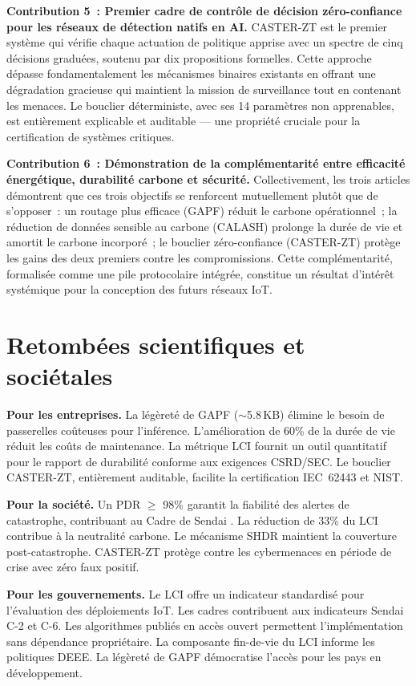 \textbf{Contribution 5~: Premier cadre de contrôle de décision zéro-confiance pour les réseaux de détection natifs en AI.}
CASTER-ZT est le premier système qui vérifie chaque actuation de politique apprise avec un spectre de cinq décisions graduées, soutenu par dix propositions formelles. Cette approche dépasse fondamentalement les mécanismes binaires existants en offrant une dégradation gracieuse qui maintient la mission de surveillance tout en contenant les menaces. Le bouclier déterministe, avec ses 14 paramètres non apprenables, est entièrement explicable et auditable --- une propriété cruciale pour la certification de systèmes critiques.

\textbf{Contribution 6~: Démonstration de la complémentarité entre efficacité énergétique, durabilité carbone et sécurité.}
Collectivement, les trois articles démontrent que ces trois objectifs se renforcent mutuellement plutôt que de s'opposer~: un routage plus efficace (GAPF) réduit le carbone opérationnel~; la réduction de données sensible au carbone (CALASH) prolonge la durée de vie et amortit le carbone incorporé~; le bouclier zéro-confiance (CASTER-ZT) protège les gains des deux premiers contre les compromissions. Cette complémentarité, formalisée comme une pile protocolaire intégrée, constitue un résultat d'intérêt systémique pour la conception des futurs réseaux IoT.


\section{Retombées scientifiques et sociétales}\label{sec:concl-retombees}

\textbf{Pour les entreprises.}
La légèreté de GAPF ($\sim$5.8\,KB) élimine le besoin de passerelles coûteuses pour l'inférence. L'amélioration de 60\% de la durée de vie réduit les coûts de maintenance. La métrique LCI fournit un outil quantitatif pour le rapport de durabilité conforme aux exigences CSRD/SEC. Le bouclier CASTER-ZT, entièrement auditable, facilite la certification IEC~62443 et NIST.

\textbf{Pour la société.}
Un PDR $\geq$ 98\% garantit la fiabilité des alertes de catastrophe, contribuant au Cadre de Sendai \cite{UNDRR2015Sendai}. La réduction de 33\% du LCI contribue à la neutralité carbone. Le mécanisme SHDR maintient la couverture post-catastrophe. CASTER-ZT protège contre les cybermenaces en période de crise avec zéro faux positif.

\textbf{Pour les gouvernements.}
Le LCI offre un indicateur standardisé pour l'évaluation des déploiements IoT. Les cadres contribuent aux indicateurs Sendai C-2 et C-6. Les algorithmes publiés en accès ouvert permettent l'implémentation sans dépendance propriétaire. La composante fin-de-vie du LCI informe les politiques DEEE. La légèreté de GAPF démocratise l'accès pour les pays en développement.

